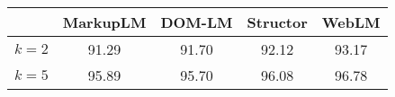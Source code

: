 \renewcommand{\arraystretch}{1.15}

\begin{tabular}{|l|cccc|}
\hline
& MarkupLM & DOM-LM & Structor & WebLM \\ %
\hline
\multicolumn{1}{|l|}{$k = 2$} & 91.29        & 91.70      & 92.12        & 93.17     \\ %
\multicolumn{1}{|l|}{$k = 5$} & 95.89        & 95.70      & 96.08        & 96.78     \\ %
\hline
\end{tabular}